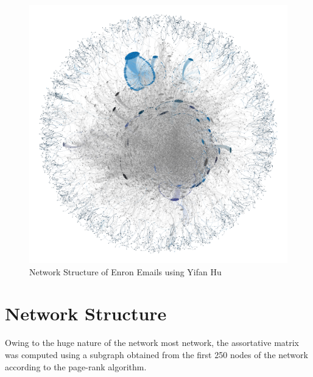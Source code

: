 \documentclass[11pt, oneside]{article}   	%
\begin{document}
	\begin{figure}
  \centering
  \includegraphics[width=\columnwidth]{na-ee-graph-final.png}
  \caption{Network Structure of Enron Emails using Yifan Hu }
\end{figure}

\pagebreak

\section{Network Structure}
Owing to the huge nature of the network most network, the assortative matrix was computed using a subgraph obtained from the first 250 nodes of the network according to the page-rank algorithm.
\end{document}
